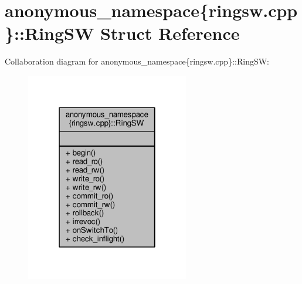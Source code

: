 \hypertarget{structanonymous__namespace_02ringsw_8cpp_03_1_1RingSW}{\section{anonymous\-\_\-namespace\{ringsw.\-cpp\}\-:\-:Ring\-S\-W Struct Reference}
\label{structanonymous__namespace_02ringsw_8cpp_03_1_1RingSW}
}


Collaboration diagram for anonymous\-\_\-namespace\{ringsw.\-cpp\}\-:\-:Ring\-S\-W\-:
\nopagebreak
\begin{figure}[H]
\begin{center}
\leavevmode
\includegraphics[width=202pt]{structanonymous__namespace_02ringsw_8cpp_03_1_1RingSW__coll__graph}
\end{center}
\end{figure}
